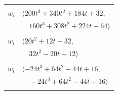 \documentclass[11pt]{article}
\begin{document}
\begin{longtable}{@{}ll@{}}
\addlinespace[2pt]
\multicolumn{2}{@{}p{0.97\textwidth}@{}}{$i=48$, $D_i=8$, $\rho_{ij}$: $1{:}2, \allowbreak 9{:}2, \allowbreak 20{:}1, \allowbreak 21{:}2, \allowbreak 22{:}1, \allowbreak 28{:}2, \allowbreak 34{:}2, \allowbreak 38{:}2, \allowbreak 44{:}1, \allowbreak 47{:}1, \allowbreak 50{:}1$}\\
$w_i$ & $\langle 200t^{3}+340t^{2}+184t+32,$\\
 & $\quad 160t^{3}+308t^{2}+224t+64\rangle$\\
\addlinespace[2pt]
\multicolumn{2}{@{}p{0.97\textwidth}@{}}{$i=49$, $D_i=4$, $\rho_{ij}$: $3{:}1, \allowbreak 4{:}2, \allowbreak 21{:}1, \allowbreak 25{:}1, \allowbreak 28{:}2, \allowbreak 29{:}2$}\\
$w_i$ & $\langle 20t^{2}+12t-32,$\\
 & $\quad 32t^{2}-20t-12\rangle$\\
\addlinespace[2pt]
\multicolumn{2}{@{}p{0.97\textwidth}@{}}{$i=50$, $D_i=2$, $\rho_{ij}$: $0{:}2, \allowbreak 1{:}1, \allowbreak 2{:}1, \allowbreak 19{:}2, \allowbreak 29{:}1, \allowbreak 37{:}1, \allowbreak 48{:}2$}\\
$w_i$ & $\langle -24t^{3}+64t^{2}-44t+16,$\\
 & $\quad -24t^{3}+64t^{2}-44t+16\rangle$\\
\addlinespace[2pt]
\end{longtable}
\endgroup
\end{document}
